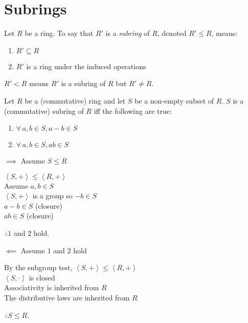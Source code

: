 \documentclass[letterpaper,12pt,fleqn]{article}
\newcommand{\group}[2]{\left<#1,#2\right>}
\begin{document}
\section*{Subrings}

\begin{definition}
  Let $R$ be a ring. To say that $R'$ is a \emph{subring} of $R$, denoted
  $R'\le R$, means:
  \begin{enumerate}
  \item $R'\subseteq R$
  \item $R'$ is a ring under the induced operations
  \end{enumerate}

  $R'<R$ means $R'$ is a subring of $R$ but $R'\ne R$.
\end{definition}

\begin{theorem}
  Let $R$ be a (commutative) ring and let $S$ be a non-empty subset of $R$. $S$ is a
  (commutative) subring of $R$ iff the following are true:
  \begin{enumerate}
  \item $\forall\,a,b\in S,a-b\in S$
  \item $\forall\,a,b\in S,ab\in S$
  \end{enumerate}
\end{theorem}

\begin{theproof}
  \listbreak
  \begin{description}
    \begin{minipage}[t]{3in}
    \item $\implies$ Assume $S\le R$

      $\group{S}{+}\le\group{R}{+}$ \\
      Assume $a,b\in S$ \\
      $\group{S}{+}$ is a group so $-b\in S$ \\
      $a-b\in S$ (closure) \\
      $ab\in S$ (closure)
    
      $\therefore 1$ and $2$ hold.
    \end{minipage}
    \begin{minipage}[t]{3in}
    \item $\impliedby$ Assume $1$ and $2$ hold

      By the subgroup test, $\group{S}{+}\le\group{R}{+}$ \\
      $\group{S}{\cdot}$ is closed \\
      Associativity is inherited from $R$ \\
      The distributive laws are inherited from $R$

      $\therefore S\le R$.
    \end{minipage}
  \end{description}
\end{theproof}
\end{document}

